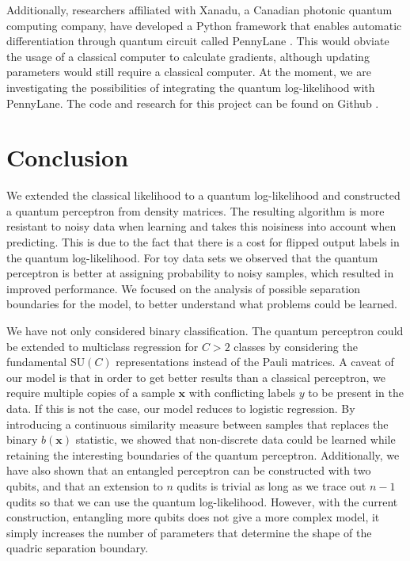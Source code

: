\noindent Additionally, researchers affiliated with Xanadu, a Canadian photonic quantum computing company, have developed a Python framework that enables automatic differentiation through quantum circuit called PennyLane \cite{Bergholm2018, Schuld2019b}. This would obviate the usage of a classical computer to calculate gradients, although updating parameters would still require a classical computer. At the moment, we are investigating the possibilities of integrating the quantum log-likelihood with PennyLane. The code and research for this project can be found on Github \cite{WiersemaGit2019b}.

\section{Conclusion}

We extended the classical likelihood to a quantum log-likelihood and constructed a quantum perceptron from density matrices. The resulting algorithm is more resistant to noisy data when learning and takes this noisiness into account when predicting. This is due to the fact that there is a cost for flipped output labels in the quantum log-likelihood. For toy data sets we observed that the quantum perceptron is better at assigning probability to noisy samples, which resulted in improved performance. We focused on the analysis of possible separation boundaries for the model, to better understand what problems could be learned. \newline

\noindent We have not only considered binary classification. The quantum perceptron could be extended to multiclass regression for $C>2$ classes by considering the fundamental $\text{SU}(C)$ representations instead of the Pauli matrices. A caveat of our model is that in order to get better results than a classical perceptron, we require multiple copies of a sample $\mathbf{x}$ with conflicting labels $y$ to be present in the data. If this is not the case, our model reduces to logistic regression. By introducing a continuous similarity measure between samples that replaces the binary $b(\mathbf{x})$ statistic, we showed that non-discrete data could be learned while retaining the interesting boundaries of the quantum perceptron. Additionally, we have also shown that an entangled perceptron can be constructed with two qubits, and that an extension to $n$ qudits is trivial as long as we trace out $n-1$ qudits so that we can use the quantum log-likelihood. However, with the current construction, entangling more qubits does not give a more complex model, it simply increases the number of parameters that determine the shape of the quadric separation boundary. \newline

